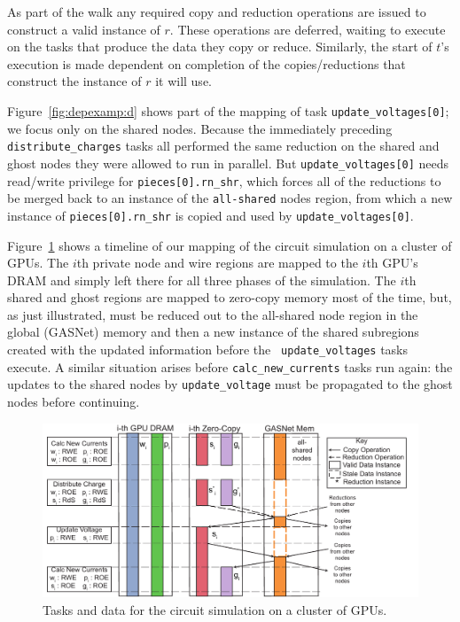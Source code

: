 As part of the walk any required copy and reduction operations are
issued to construct a valid instance of $r$.  These operations are
deferred, waiting to execute on the tasks that produce the data they
copy or reduce. Similarly, the start of $t$'s execution is made
dependent on completion of the copies/reductions that construct the
instance of $r$ it will use.

Figure~\ref{fig:depexamp:d} shows part of the mapping of task {\tt update\_voltages[0]}; we focus
only on the shared nodes.
Because the immediately preceding {\tt distribute\_charges} tasks all performed the same reduction
on the shared and ghost nodes they were allowed to run in parallel.  But {\tt update\_voltages[0]}
needs read/write privilege for {\tt pieces[0].rn\_shr}, which forces all of the reductions to be merged
back to an instance of the {\tt all-shared} nodes region, from which a new instance of {\tt pieces[0].rn\_shr} is copied and used by {\tt update\_voltages[0]}.

Figure~\ref{fig:gpumapping} shows a timeline of our mapping of the
circuit simulation on a cluster of GPUs.  The $i$th private node and
wire regions are mapped to the $i$th GPU's DRAM and simply left there
for all three phases of the simulation.  The $i$th shared and ghost
regions are mapped to zero-copy memory most of the time, but, as just
illustrated, must be reduced out to the all-shared node region in the
global (GASNet) memory and then a new instance of the shared
subregions created with the updated information before the {\tt
  update\_voltages} tasks execute.  A similar situation arises before
{\tt calc\_new\_currents} tasks run again: the updates to the shared
nodes by {\tt update\_voltage} must be propagated to the ghost nodes
before continuing.

\begin{figure}
\includegraphics[scale=0.48]{figs/CircuitMem.pdf}
\caption{Tasks and data for the circuit simulation on a cluster of GPUs.}
\label{fig:gpumapping}
\end{figure}

